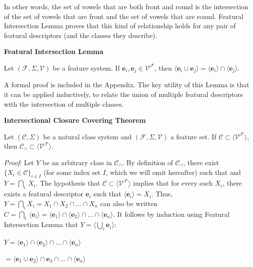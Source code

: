 \documentclass[11pt, oneside]{article}   	%
\begin{document}
In other words, the set of vowels that are both front and round is the intersection of the set of vowels that are front and the set of vowels that are round. Featural Intersection Lemma proves that this kind of relationship holds for any pair of featural descriptors (and the classes they describe).

\vspace{\baselineskip} \noindent \textbf{Featural Intersection Lemma}

Let $(\mathcal F, \Sigma, \mathcal V)$ be a feature system. If $\mathbf{e}_i, \mathbf{e}_j \in \mathcal V^\mathcal F$, then $\langle \mathbf{e}_i \cup \mathbf{e}_j \rangle =  \langle \mathbf{e}_i \rangle \cap \langle \mathbf{e}_j \rangle$.

\vspace{\baselineskip} \noindent A formal proof is included in the Appendix. The key utility of this Lemma is that it can be applied inductively, to relate the union of multiple featural descriptors with the intersection of multiple classes.

\vspace{\baselineskip} \noindent \textbf{Intersectional Closure Covering Theorem}

Let $(\mathcal C, \Sigma)$ be a natural class system and $(\mathcal F, \Sigma, \mathcal V)$ a feature set. If $\mathcal C \subset \langle \mathcal V^\mathcal F \rangle$, then $\mathcal C_\cap \subset\langle \mathcal V^\mathcal F \rangle $.

\textit{Proof}: Let $Y$ be an arbitrary class in $\mathcal C_\cap$. By definition of $\mathcal C_\cap$, there exist $\{X_i \in \mathcal C\}_{i \in I}$ (for some index set $I$, which we will omit hereafter) such that and $Y = \bigcap_i \, X_i$. The hypothesis that $\mathcal C \subset \langle \mathcal V^\mathcal F \rangle $ implies that for every such $X_i$, there exists a featural descriptor $\mathbf{e}_i$ such that $\langle \mathbf{e}_i \rangle = X_i$. Thus, $Y = \bigcap_i X_i = X_1 \cap X_2 \cap \ldots \cap X_n$ can also be written $C = \bigcap_i \, \langle \mathbf{e}_i \rangle = \langle \mathbf{e}_1 \rangle \cap \langle \mathbf{e}_2 \rangle \cap \ldots \cap \langle \mathbf{e}_n \rangle$. It follows by induction using Featural Intersection Lemma that $Y = \langle \bigcup_i \mathbf{e}_i \rangle$:

$Y = \langle \mathbf{e}_1 \rangle \cap  \langle \mathbf{e}_2 \rangle \cap \ldots \cap  \langle \mathbf{e}_n \rangle$

\quad $ = \langle \mathbf{e}_1 \cup \mathbf{e}_2 \rangle \cap \mathbf{e}_3 \cap \ldots \cap \langle \mathbf{e}_n \rangle$
\end{document}
